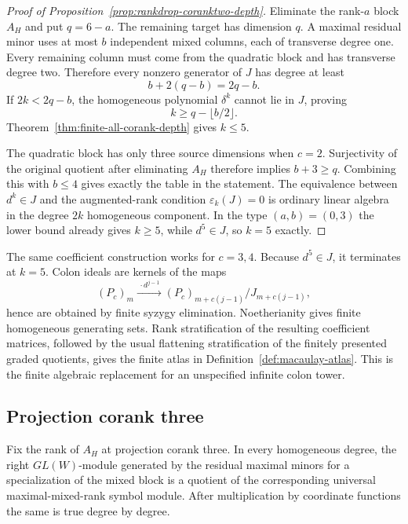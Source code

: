 \begin{proof}[Proof of Proposition~\ref{prop:rankdrop-coranktwo-depth}]
Eliminate the rank-\(a\) block \(A_H\) and put \(q=6-a\).
The remaining target has dimension \(q\).  A maximal residual minor
uses at most \(b\) independent mixed columns, each of transverse
degree one.  Every remaining column must come from the quadratic
block and has transverse degree two.  Therefore every nonzero
generator of \(J\) has degree at least
\[
 b+2(q-b)=2q-b.
\]
If \(2k<2q-b\), the homogeneous polynomial \(\delta^k\) cannot lie in
\(J\), proving
\[
 k\ge q-\lfloor b/2\rfloor.
\]
Theorem~\ref{thm:finite-all-corank-depth} gives \(k\le5\).

The quadratic block has only three source dimensions when \(c=2\).
Surjectivity of the original quotient after eliminating \(A_H\)
therefore implies \(b+3\ge q\).  Combining this with \(b\le4\) gives
exactly the table in the statement.  The equivalence between
\(d^k\in J\) and the augmented-rank condition
\(\varepsilon_k(J)=0\) is ordinary linear algebra in the degree
\(2k\) homogeneous component.  In the type \((a,b)=(0,3)\) the lower
bound already gives \(k\ge5\), while \(d^5\in J\), so \(k=5\)
exactly.
\end{proof}

The same coefficient construction works for \(c=3,4\).  Because
\(d^5\in J\), it terminates at \(k=5\).  Colon ideals are kernels of
the maps
\[
 (P_c)_m\xrightarrow{\ \cdot d^{j-1}\ }
 (P_c)_{m+c(j-1)}/J_{m+c(j-1)},
\]
hence are obtained by finite syzygy elimination.  Noetherianity gives
finite homogeneous generating sets.  Rank stratification of the
resulting coefficient matrices, followed by the usual flattening
stratification of the finitely presented graded quotients, gives the
finite atlas in Definition~\ref{def:macaulay-atlas}.  This is the
finite algebraic replacement for an unspecified infinite colon tower.

\subsection{Projection corank three}

\begin{lemma}
\label{lem:corank3-functorial-symbol}
Fix the rank of \(A_H\) at projection corank three.  In every
homogeneous degree, the right \(GL(W)\)-module generated by the
residual maximal minors for a specialization of the mixed block is a
quotient of the corresponding universal maximal-mixed-rank symbol
module.  After multiplication by coordinate functions the same is
true degree by degree.
\end{lemma}

